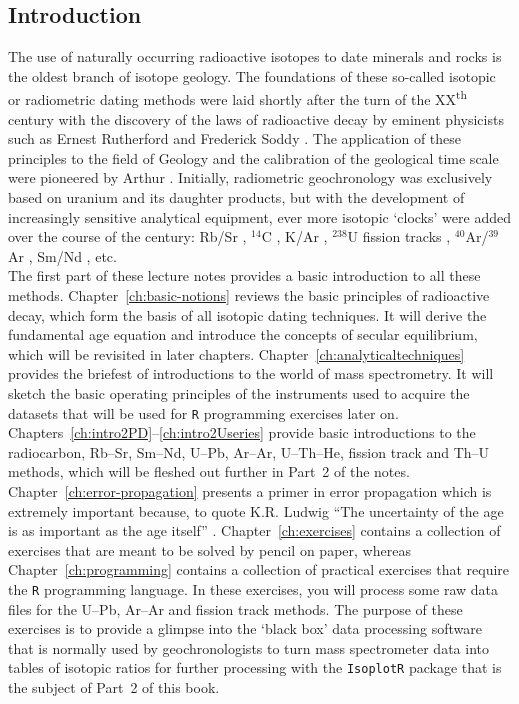 \begin{refsection}
\chapter{Introduction}
\label{ch:intro1}

The use of naturally occurring radioactive isotopes to date minerals
and rocks is the oldest branch of isotope geology. The foundations of
these so-called isotopic or radiometric dating methods were laid
shortly after the turn of the XX\textsuperscript{th} century with the
discovery of the laws of radioactive decay by eminent physicists such
as Ernest Rutherford and Frederick Soddy \citep{rutherford1902a,
  rutherford1902b}.  The application of these principles to the field
of Geology and the calibration of the geological time scale were
pioneered by Arthur \citet{holmes1911, holmes1913,
  holmes1947}. Initially, radiometric geochronology was exclusively
based on uranium and its daughter products, but with the development
of increasingly sensitive analytical equipment, ever more isotopic
`clocks' were added over the course of the century: Rb/Sr
\citep{hahn1943}, $^{14}$C \citep{libby1946}, K/Ar
\citep{aldrich1948}, $^{238}$U fission tracks \citep{price1963},
$^{40}$Ar/$^{39}$Ar \citep{merrihue1966}, Sm/Nd \citep{lugmair1974},
etc.\\

The first part of these lecture notes provides a basic introduction to
all these methods. Chapter~\ref{ch:basic-notions} reviews the basic
principles of radioactive decay, which form the basis of all isotopic
dating techniques. It will derive the fundamental age equation and
introduce the concepts of secular equilibrium, which will be revisited
in later chapters. Chapter~\ref{ch:analyticaltechniques} provides the
briefest of introductions to the world of mass spectrometry. It will
sketch the basic operating principles of the instruments used to
acquire the datasets that will be used for \texttt{R} programming
exercises later on. Chapters~\ref{ch:intro2PD}--\ref{ch:intro2Useries}
provide basic introductions to the radiocarbon, Rb--Sr, Sm--Nd, U--Pb,
Ar--Ar, U--Th--He, fission track and Th--U methods, which will be
fleshed out further in Part~2 of the
notes.\\

Chapter~\ref{ch:error-propagation} presents a primer in error
propagation which is extremely important because, to quote K.R. Ludwig
``The uncertainty of the age is as important as the age
itself'' \citep{ludwig2003b}. Chapter~\ref{ch:exercises} contains a
collection of exercises that are meant to be solved by pencil on
paper, whereas Chapter~\ref{ch:programming} contains a collection of
practical exercises that require the \texttt{R} programming language.
In these exercises, you will process some raw data files for the
U--Pb, Ar--Ar and fission track methods. The purpose of these
exercises is to provide a glimpse into the `black box' data processing
software that is normally used by geochronologists to turn mass
spectrometer data into tables of isotopic ratios for further
processing with the \texttt{IsoplotR} package that is the subject of
Part~2 of this book.\\


\end{refsection}
